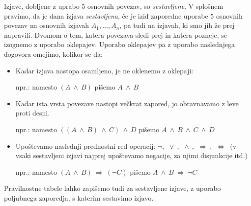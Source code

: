 \documentclass[11pt,paper=b5,DIV=13,headinclude,footinclude]{scrbook}
\newcounter{example}
\def\ali {{~\vee~}}
\def\inn {{~\wedge~}}
\def\sledi {{~\Rightarrow~}}
\def\cee {{~\Leftrightarrow~}}
\begin{document}
\medskip

Izjave, dobljene z uprabo $5$ osnovnih povezav, so \emph{ sestavljene}. V splošnem pravimo, da je dana izjava \emph{ sestavljena}, če je izid
zaporedne uporabe $5$ osnovnih povezav na osnovnih izjavah $A_1,\ldots, A_n$, pa tudi na izjavah, ki smo jih že prej napravili.
Dvomom o tem, katera povezava sledi prej in katera pozneje, se izognemo z uporabo oklepajev.
Uporabo oklepajev pa z uporabo naslednjega dogovora omejimo, kolikor se da:
\begin{itemize}
  \item Kadar izjava nastopa osamljeno, je ne oklenemo z oklepaji:

  npr.: namesto $(A\inn B)$ pišemo $A\inn B$

  \item Kadar ista vrsta povezave nastopi večkrat zapored, jo obravnavamo z leve proti desni.

  npr.: namesto $((A\inn B) \inn C) \inn D$ pišemo $A\inn B \inn C\inn D$

  \item Upoštevamo naslednji prednostni red operacij:
  $\neg$, $\ali$, $\inn$, $\sledi$, $\cee$ (v vsaki sestavljeni izjavi najprej upoštevamo negacije, za njimi disjunkcije itd.)

  npr.: namesto $(A\inn B) \sledi (\neg C)$ pišemo  $A\inn B \sledi\neg C$
\end{itemize}

\medskip
Pravilnostne tabele lahko zapišemo tudi za sestavljene izjave, z uporabo poljubnega
zaporedja, s katerim sestavimo izjavo.
\pagebreak
{}
\end{document}
